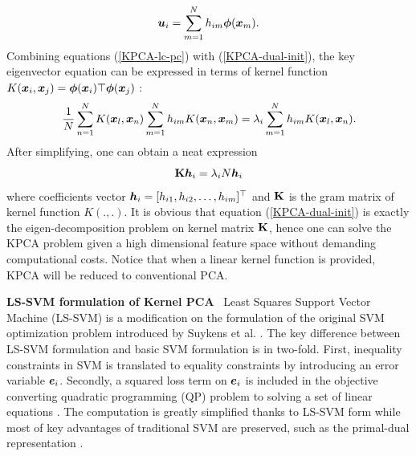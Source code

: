 \begin{equation}
    \boldsymbol{u}_i = \sum_{m=1}^N h_{im}\boldsymbol{\phi}(\boldsymbol{x}_m).
    \label{KPCA-lc-pc}
\end{equation}
Combining equations (\ref{KPCA-lc-pc}) with (\ref{KPCA-dual-init}), the key eigenvector equation can be expressed in terms of kernel function $K(\boldsymbol{x}_i,\boldsymbol{x}_j) = \boldsymbol{\phi}(\boldsymbol{x}_i)\top \boldsymbol{\phi}(\boldsymbol{x}_j)$ : 
\begin{equation}
    \frac{1}{N} \sum_{n=1}^{N} K(\boldsymbol{x}_l,\boldsymbol{x}_n) \sum_{m=1}^{N} h_{im} K(\boldsymbol{x}_n,\boldsymbol{x}_m) = \lambda_i \sum_{m=1}^{N} h_{im} K(\boldsymbol{x}_l,\boldsymbol{x}_n).
\end{equation}
After simplifying, one can obtain a neat expression 
\begin{equation}
    \mathbf{K}\boldsymbol{h}_i = \lambda_i N \boldsymbol{h}_i
    \label{KPCA-dual-obj}
\end{equation}
where coefficients vector $\boldsymbol{h}_i = [h_{i1},h_{i2},\dots, h_{im}]^\top$ and $\mathbf{K}$ is the gram matrix of kernel function $K(.,.)$. It is obvious that equation (\ref{KPCA-dual-init}) is exactly the eigen-decomposition problem on kernel matrix $\mathbf{K}$, hence one can solve the KPCA problem given a high dimensional feature space without demanding computational costs. Notice that when a linear kernel function is provided, KPCA will be reduced to conventional PCA.

\noindent\textbf{LS-SVM formulation of Kernel PCA} \ Least Squares Support Vector Machine (LS-SVM) is a modification on the formulation of the original SVM optimization problem introduced by Suykens et al. \cite{suykensLeastSquaresSupport1999,suykensLeastSquaresSupport2002}. The key difference between LS-SVM formulation and basic SVM formulation is in two-fold. First, inequality constraints in SVM is translated to equality constraints by introducing an error variable $\boldsymbol{e}_i$. Secondly, a squared loss term on $\boldsymbol{e}_i$ is included in the objective converting quadratic programming (QP) problem to solving a set of linear equations \cite{suykensLeastSquaresSupport2002}. The computation is greatly simplified thanks to LS-SVM form while most of key advantages of traditional SVM are preserved,  such as the primal-dual representation \cite{suykensPrimalDualModel2010}. 

